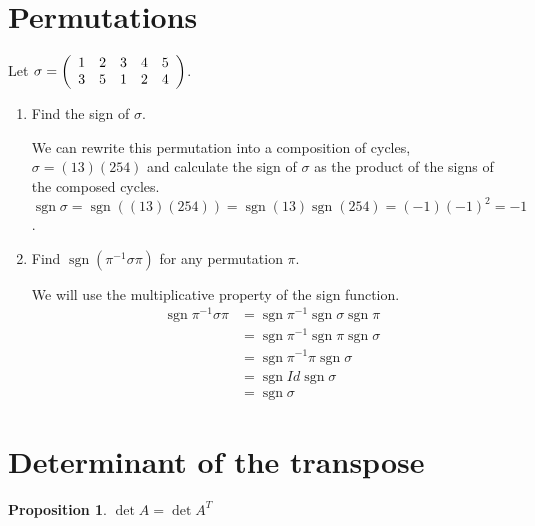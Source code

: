 \documentclass{article}
\newtheorem{proposition}{Proposition}
\DeclareMathOperator{\sgn}{sgn}
\begin{document}
\section{Permutations}
Let
$\sigma =
\left(
    \begin{array}{c c c c c}
        1 & 2 & 3 & 4 & 5 \\
        3 & 5 & 1 & 2 & 4
    \end{array}
\right)$.
\begin{enumerate}
    \item Find the sign of $\sigma$.

        We can rewrite this permutation into a composition of cycles,
        $\sigma = (13)(254)$
        and calculate the sign of $\sigma$ as the product of the signs of the composed cycles.
        $\sgn{\sigma} = \sgn{((13)(254))} = \sgn{(13)}\sgn{(254)} = (-1) (-1)^2 = -1$.

    \item Find $\sgn{(\pi^{-1}\sigma\pi)}$ for any permutation $\pi$.

            We will use the multiplicative property of the sign function.
            \begin{align*}
                \sgn{\pi^{-1}\sigma\pi} &= \sgn{\pi^{-1}} \sgn\sigma \sgn\pi \\
                            &= \sgn{\pi^{-1}} \sgn{\pi} \sgn{\sigma} \\
                            &= \sgn{\pi^{-1}\pi} \sgn{\sigma} \\
                            &= \sgn{Id} \sgn{\sigma} \\
                            &= \sgn{\sigma}
            \end{align*}
\end{enumerate}


\section{Determinant of the transpose}

\begin{proposition}
    $\det A = \det {A^T}$
\end{proposition}
\end{document}
